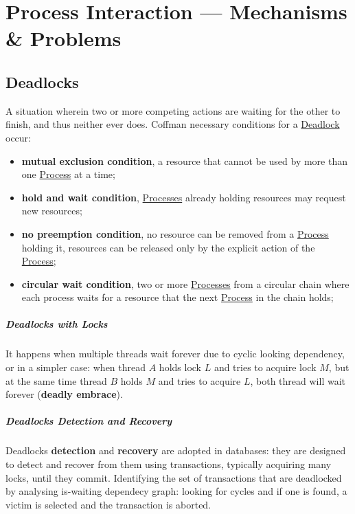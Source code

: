 \chapter{Process Interaction --- Mechanisms \& Problems}\label{chap:pi_process_interaction_mechanisms_problems} %
\section{Deadlocks}\label{sec:pi_deadlocks} %
A situation wherein two or more competing actions are waiting for the other to finish, and thus neither ever does.
Coffman necessary conditions for a \hyperref[def:deadlock]{Deadlock} occur:
\begin{itemize}
    \item \textbf{mutual exclusion condition}, a resource that cannot be used by more than one \hyperref[def:process]{Process} at a time;
    \item \textbf{hold and wait condition}, \hyperref[def:process]{Processes} already holding resources may request new resources;
    \item \textbf{no preemption condition}, no resource can be removed from a \hyperref[def:process]{Process} holding it, resources can be released only by the explicit action of the \hyperref[def:process]{Process};
    \item \textbf{circular wait condition}, two or more \hyperref[def:process]{Processes} from a circular chain where each process waits for a resource that the next \hyperref[def:process]{Process} in the chain holds;
\end{itemize}
\begin{warning}
\end{warning}
%
\paragraph{Deadlocks with Locks}\label{par:pi_deadlocks_with_locks} %
It happens when multiple threads wait forever due to cyclic looking dependency, or in a simpler case: when thread $A$ holds lock $L$ and tries to acquire lock $M$, but at the same time thread $B$ holds $M$ and tries to acquire $L$, both thread will wait forever (\textbf{deadly embrace}).
%
\paragraph{Deadlocks Detection and Recovery}\label{par:pi_deadlocks_detection_and_recovery} %
Deadlocks \textbf{detection} and \textbf{recovery} are adopted in databases: they are designed to detect and recover from them using transactions, typically acquiring many locks, until they commit.
Identifying the set of transactions that are deadlocked by analysing is-waiting dependecy graph: looking for cycles and if one is found, a victim is selected and the transaction is aborted.
\begin{warning}
\end{warning}
%
